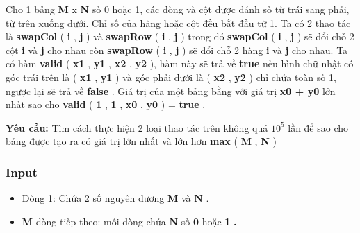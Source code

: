 





   Cho 1 bảng   \textbf{    M   }   x   \textbf{    N   }   số 0 hoặc 1, các dòng và cột được đánh số từ trái sang phải, từ trên xuống dưới. Chỉ số của hàng hoặc cột đều bắt đầu từ 1. Ta có 2 thao tác là   \textbf{    swapCol   }   (   \textbf{    i   }   ,   \textbf{    j   }   ) và   \textbf{    swapRow   }   (   \textbf{    i   }   ,   \textbf{    j   }   ) trong đó   \textbf{    swapCol   }   (   \textbf{    i   }   ,   \textbf{    j   }   ) sẽ đổi chỗ 2 cột   \textbf{    i   }   và   \textbf{    j   }   cho nhau còn   \textbf{    swapRow   }   (   \textbf{    i   }   ,   \textbf{    j   }   ) sẽ đổi chỗ 2 hàng   \textbf{    i   }   và   \textbf{    j   }   cho nhau. Ta có hàm   \textbf{    valid   }   (   \textbf{    x1   }   ,   \textbf{    y1   }   ,   \textbf{    x2   }   ,   \textbf{    y2   }   ), hàm này sẽ trả về   \textbf{    true   }   nếu hình chữ nhật có góc trái trên là (   \textbf{    x1   }   ,   \textbf{    y1   }   ) và góc phải dưới là (   \textbf{    x2   }   ,   \textbf{    y2   }   ) chỉ chứa toàn số 1, ngược lại sẽ trả về   \textbf{    false   }   . Giá trị của một bảng bằng với giá trị   \textbf{\textbf{     x0    }    +    \textbf{     y0    }}   lớn nhất sao cho   \textbf{    valid   }   (   \textbf{    1   }   ,   \textbf{    1   }   ,   \textbf{    x0   }   ,   \textbf{    y0   }   ) =   \textbf{    true   }   .  

\textbf{    Yêu cầu:   }   Tìm cách thực hiện 2 loại thao tác trên không quá   \textbf{    $10^{5}$}   lần để sao cho bảng được tạo ra có giá trị lớn nhất và lớn hơn   \textbf{    max   }   (   \textbf{    M   }   ,   \textbf{    N   }   )  

\subsubsection{   Input  }
\begin{itemize}
	\item     Dòng 1: Chứa 2 số nguyên dương    \textbf{     M    }    và    \textbf{     N    }    .   
	\item \textbf{     M    }    dòng tiếp theo: mỗi dòng chứa    \textbf{     N    }    số    \textbf{     0    }    hoặc    \textbf{     1    }\textbf{     .    }
\end{itemize}

